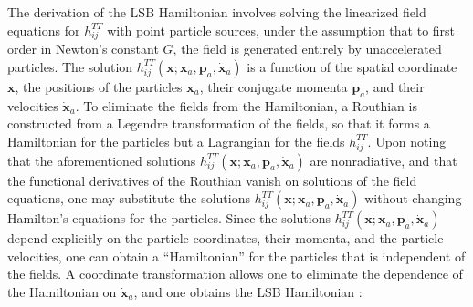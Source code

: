 \documentclass[aps,onecolumn,notitlepage,eqsecnum,nofootinbib,floatfix,superscriptaddress]{revtex4-1}
\begin{document}
The derivation of the LSB Hamiltonian involves solving the linearized field equations for $h^{TT}_{ij}$ with point particle sources, under the assumption that to first order in Newton's constant $G$, the field is generated entirely by unaccelerated particles. The solution $h^{TT}_{ij}(\textbf{x};\textbf{x}_a,\textbf{p}_a,\dot{\textbf{x}}_a)$ is a function of the spatial coordinate $\textbf{x}$, the positions of the particles $\textbf{x}_a$, their conjugate momenta $\textbf{p}_a$, and their velocities $\dot{\textbf{x}}_a$. To eliminate the fields from the Hamiltonian, a Routhian \cite{GoldsteinCM} is constructed from a Legendre transformation of the fields, so that it forms a Hamiltonian for the particles but a Lagrangian for the fields $h^{TT}_{ij}$. Upon noting that the aforementioned solutions $h^{TT}_{ij}(\textbf{x};\textbf{x}_a,\textbf{p}_a,\dot{\textbf{x}}_a)$ are nonradiative, and that the functional derivatives of the Routhian vanish on solutions of the field equations, one may substitute the solutions $h^{TT}_{ij}(\textbf{x};\textbf{x}_a,\textbf{p}_a,\dot{\textbf{x}}_a)$ without changing Hamilton's equations for the particles. Since the solutions $h^{TT}_{ij}(\textbf{x};\textbf{x}_a,\textbf{p}_a,\dot{\textbf{x}}_a)$ depend explicitly on the particle coordinates, their momenta, and the particle velocities, one can obtain a ``Hamiltonian'' for the particles that is independent of the fields. A coordinate transformation allows one to eliminate the dependence of the Hamiltonian on $\dot{\textbf{x}}_a$, and one obtains the LSB Hamiltonian \cite{PM}:
\end{document}
